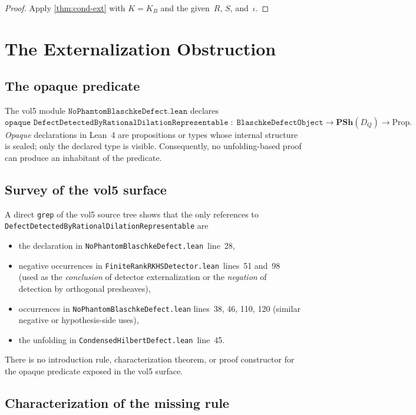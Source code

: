 \documentclass[12pt]{article}
\theoremstyle{plain}
\theoremstyle{definition}
\theoremstyle{remark}
\newcommand{\KB}{K_{B}}
\newcommand{\PSh}{\mathbf{PSh}}
\newcommand{\DQ}{D_{Q}}
\begin{document}
\begin{proof}
Apply \cref{thm:cond-ext} with $K = \KB$ and the given~$R$, $S$,
and~$\iota$.
\end{proof}

\section{The Externalization Obstruction}
\label{sec:obstruction}

\subsection{The opaque predicate}

The vol5 module $\texttt{NoPhantomBlaschkeDefect.lean}$ declares
\[
  \texttt{opaque DefectDetectedByRationalDilationRepresentable}\;:\;
  \texttt{BlaschkeDefectObject}\to\PSh(\DQ)\to\mathrm{Prop}.
\]
\emph{Opaque} declarations in Lean~4 are propositions or types whose
internal structure is sealed; only the declared type is visible.
Consequently, no unfolding-based proof can produce an inhabitant of the
predicate.

\subsection{Survey of the vol5 surface}

A direct \texttt{grep} of the vol5 source tree shows that the only
references to \texttt{DefectDetectedByRationalDilationRepresentable}
are
\begin{itemize}
  \item the declaration in \texttt{NoPhantomBlaschkeDefect.lean}~line~28,
  \item negative occurrences in
    \texttt{FiniteRankRKHSDetector.lean}~lines~51 and~98 (used as the
    \emph{conclusion} of detector externalization or the \emph{negation}
    of detection by orthogonal presheaves),
  \item occurrences in \texttt{NoPhantomBlaschkeDefect.lean} lines~38,
    46, 110, 120 (similar negative or hypothesis-side uses),
  \item the unfolding in
    \texttt{CondensedHilbertDefect.lean}~line~45.
\end{itemize}
There is no introduction rule, characterization theorem, or proof
constructor for the opaque predicate exposed in the vol5 surface.

\subsection{Characterization of the missing rule}
\end{document}
